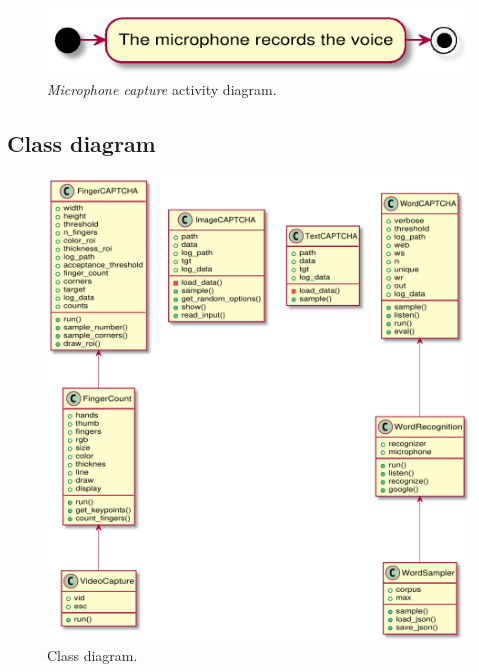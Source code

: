 \begin{figure}[h!t]
    \centering
    \includegraphics[scale=0.8]{assets/plantuml/pdf/microphone.pdf}
    \caption{\emph{Microphone capture} activity diagram.}
    \label{fig:activity:microphone}
\end{figure}

\clearpage
\subsection{Class diagram}
\begin{figure}[h!t]
    \centering
    \includegraphics[scale=0.65]{assets/plantuml/pdf/class.pdf}
    \caption{Class diagram.}
    \label{fig:class:diagram}
\end{figure}